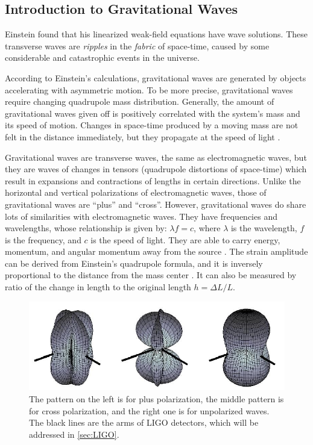 \documentclass[aps,prd,preprint]{revtex4}
\begin{document}
\subsection{Introduction to Gravitational Waves \label{sec:GW}}
Einstein found that his linearized weak-field equations have wave solutions. \cite{O1} These transverse waves are \emph{ripples} in the \emph{fabric} of space-time, caused by some considerable and catastrophic events in the universe.
\par According to Einstein's calculations, gravitational waves are generated by objects accelerating with asymmetric motion. To be more precise, gravitational waves require changing quadrupole mass distribution. Generally, the amount of gravitational waves given off is positively correlated with the system's mass and its speed of motion. Changes in space-time produced by a moving mass are not felt in the distance immediately, but they propagate at the speed of light \cite{SBackground}.
\par Gravitational waves are transverse waves, the same as electromagnetic waves, but they are waves of changes in tensors (quadrupole distortions of space-time) which result in expansions and contractions of lengths in certain directions. Unlike the horizontal and vertical polarizations of electromagnetic waves, those of gravitational waves are \enquote{plus} and \enquote{cross}. However, gravitational waves do share lots of similarities with electromagnetic waves. They have frequencies and wavelengths, whose relationship is given by: $\lambda f=c$, where $\lambda$ is the wavelength, $f$ is the frequency, and $c$ is the speed of light. They are able to carry energy, momentum, and angular momentum away from the source \cite{SBackground}. The strain amplitude can be derived from Einstein's quadrupole formula, and it is inversely proportional to the distance from the mass center \cite{relativity1,relativity2}. It can also be measured by ratio of the change in length to the original length $h = \Delta L/L$. 
\begin{figure}
	\includegraphics{G-wave_polarizations}
	\caption{The pattern on the left is for plus polarization, the middle pattern is for cross polarization, and the right one is for unpolarized waves. The black lines are the arms of LIGO detectors, which will be addressed in \ref{sec:LIGO}. \cite{instrument}}
\end{figure}
\end{document}
